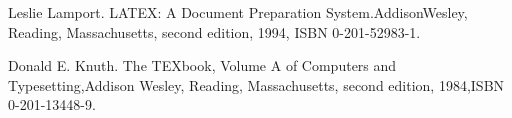 
\setlength{\baselineskip}{18pt}
\songti\xiaosi
\begin{thebibliography}{99}

Leslie Lamport. LATEX: A Document Preparation System.AddisonWesley, Reading, Massachusetts, second edition, 1994, ISBN 0-201-52983-1.

Donald E. Knuth. The TEXbook, Volume A of Computers and Typesetting,Addison Wesley, Reading, Massachusetts, second edition, 1984,ISBN 0-201-13448-9.


\end{thebibliography}